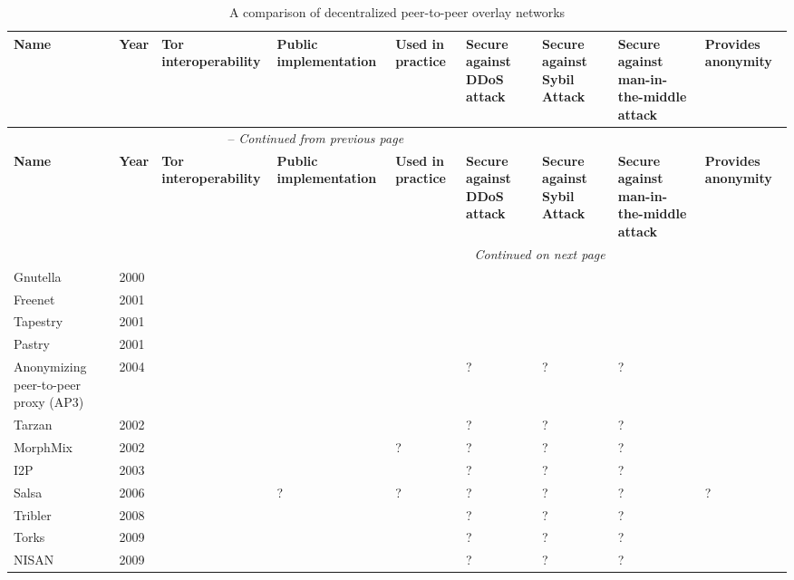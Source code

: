 \begin{center}
    \begin{longtable}{ | p{1.9cm} | p{0.8cm} | p{1.6cm} | p{2.2cm} | p{2.2cm} | p{2.5cm} | p{2.5cm} | p{2.5cm} | p{2cm} | }
  		\caption{A comparison of decentralized peer-to-peer overlay networks} \\ \hline
	    \textbf{Name} & \textbf{Year} & \textbf{Tor interoperability} & \textbf{Public implementation} & \textbf{Used in practice} & \textbf{Secure against DDoS attack} & \textbf{Secure against Sybil Attack} & \textbf{Secure against man-in-the-middle attack} & \textbf{Provides anonymity} \\ \hline
		\endfirsthead
		\multicolumn{7}{c}{\tablename\ \thetable\ -- \textit{Continued from previous page}} \\ \hline
	    \textbf{Name} & \textbf{Year} & \textbf{Tor interoperability} & \textbf{Public implementation} & \textbf{Used in practice} & \textbf{Secure against DDoS attack} & \textbf{Secure against Sybil Attack} & \textbf{Secure against man-in-the-middle attack} & \textbf{Provides anonymity} \\ \hline
		\endhead
		\hline \multicolumn{7}{r}{\textit{Continued on next page}} \\
		\endfoot
		\hline
		\endlastfoot
	    
		Gnutella & 2000 & \xmark & \checkmark & \checkmark & \xmark & \xmark & \xmark & \xmark \\ \hline
		Freenet & 2001 & \xmark & \checkmark & \checkmark & \checkmark & \xmark & \xmark & \checkmark \\ \hline
		Tapestry & 2001 & \xmark & \checkmark & \checkmark & \checkmark & \xmark & \xmark & \xmark \\ \hline
		Pastry & 2001 & \xmark & \checkmark & \checkmark & \checkmark & \xmark & \xmark & \xmark \\ \hline
		Anonymizing peer-to-peer proxy (AP3) & 2004 & \xmark & \xmark & \xmark & ? & ? & ? & \checkmark \\ \hline
		Tarzan & 2002 & \xmark & \xmark & \xmark & ? & ? & ? & \checkmark \\ \hline
		MorphMix & 2002 & \xmark & \checkmark & ? & ? & ? & ? & \checkmark \\ \hline
		I2P & 2003 & \xmark & \checkmark & \checkmark & ? & ? & ? & \checkmark\\ \hline
		Salsa & 2006 & \xmark & ? & ? & ? & ? & ? & ?\\ \hline
		Tribler & 2008 & \xmark & \checkmark & \checkmark & ? & ? & ? & \xmark \\ \hline
		Torks & 2009 & \checkmark & \xmark & \xmark & ? & ? & ? & \checkmark \\ \hline
		NISAN & 2009 & \xmark & \xmark & \xmark & ? & ? & ? & \checkmark \\ \hline
    \end{longtable}
\end{center}